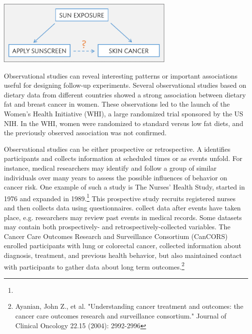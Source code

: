 \begin{center}
	\includegraphics[height=1.25in]{ch_intro_to_data_oi_biostat/figures/variables/confoundingVariable.png}
\end{center}

Observational studies can reveal interesting patterns or important associations useful for designing follow-up experiments. Several observational studies based on dietary data from different countries showed a strong association between dietary fat and breast cancer in women.  These observations led to the launch of the Women's Health Initiative (WHI), a large randomized trial sponsored by the US NIH.  In the WHI, women were randomized to standard versus low fat diets, and the previously observed association was not confirmed.  


Observational studies can be either prospective or retrospective. A  identifies participants and collects information at scheduled times or as events unfold. For instance, medical researchers may identify and follow a group of similar individuals over many years to assess the possible influences of behavior on cancer risk. One example of such a study is The Nurses' Health Study, started in 1976 and expanded in 1989.\footnote{\texttt{}} This prospective study recruits registered nurses and then collects data using questionnaires.  collect data after events have taken place, e.g. researchers may review past events in medical records. Some datasets may contain both prospectively- and retrospectively-collected variables. The Cancer Care Outcomes Research and Surveillance Consortium (CanCORS) enrolled participants with lung or colorectal cancer, collected information about diagnosis, treatment, and previous health behavior, but also maintained contact with participants to gather data about long term outcomes.\footnote{Ayanian, John Z., et al. "Understanding cancer treatment and outcomes: the cancer care outcomes research and surveillance consortium." Journal of Clinical Oncology 22.15 (2004): 2992-2996}  


